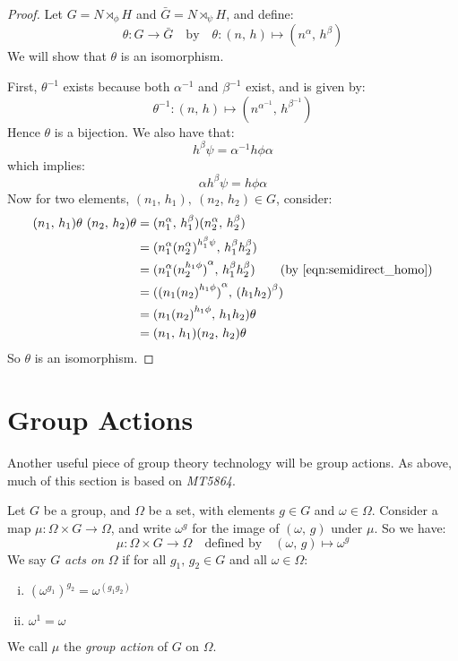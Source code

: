 \begin{proof}
    Let \(G = N \rtimes_\phi H\) and \(\bar{G} = N \rtimes_\psi H\), and define:
    \[\theta:G \to \bar{G} \quad \text{by} \quad \theta:(n,\,h) \mapsto (n^\alpha,\,h^\beta)\]
    We will show that \(\theta\) is an isomorphism.

    First, \(\theta^{-1}\) exists because both \(\alpha^{-1}\) and \(\beta^{-1}\) exist, and is given by:
    \[\theta^{-1}:(n,\,h) \mapsto (n^{\alpha^{-1}},\,h^{\beta^{-1}})\]
    Hence \(\theta\) is a bijection.
    We also have that:
    \[h^\beta\psi = \alpha^{-1}h\phi\alpha\]
    which implies:
    \[\alpha h^\beta\psi = h\phi\alpha \tag{\ast}\label{eqn:semidirect_homo}\]
    Now for two elements, \((n_1,\,h_1),\ (n_2,\,h_2) \in G\), consider:
    \begin{align*}
        (n_1,\, h_1)\theta\ (n_2,\, h_2)\theta &= (n_1^\alpha,\, h_1^\beta)(n_2^\alpha,\, h_2^\beta) \\
        &= (n_1^\alpha {(n_2^\alpha)}^{h_1^\beta\psi},\, h_1^\beta h_2^\beta) \\
        &= (n_1^\alpha {(n_2^{h_1\phi})}^\alpha,\, h_1^\beta h_2^\beta) \tag{by~\ref{eqn:semidirect_homo}} \\
        &= ({(n_1 {(n_2)}^{h_1\phi})}^\alpha,\, {(h_1 h_2)}^\beta) \\
        &= (n_1 {(n_2)}^{h_1\phi},\, h_1 h_2)\theta \\
        &= (n_1,\, h_1)(n_2,\, h_2)\theta
    \end{align*}
    So \(\theta\) is an isomorphism.
\end{proof}

\section{Group Actions}
Another useful piece of group theory technology will be group actions.
As above, much of this section is based on \textit{MT5864}.

\begin{definition}
    \raggedright
    Let \(G\) be a group, and \(\Omega\) be a set, with elements \(g \in G\) and \(\omega \in \Omega\).
    Consider a map \(\mu:\Omega \times G \to \Omega\), and write \(\omega^g\) for the image of \((\omega,\,g)\) under
    \(\mu\).
    So we have:
    \[\mu:\Omega \times G \to \Omega \quad \text{defined by} \quad (\omega,\,g) \mapsto \omega^g\]
    We say \(G\) \emph{acts on} \(\Omega\) if for all \(g_1,\,g_2 \in G\) and all \(\omega \in \Omega\):
    \begin{enumerate}[(i)]
        \item \({(\omega^{g_1})}^{g_2} = \omega^{(g_1 g_2)}\)
        \item \(\omega^1 = \omega\)
    \end{enumerate}
    We call \(\mu\) the \emph{group action} of \(G\) on \(\Omega\).
\end{definition}

